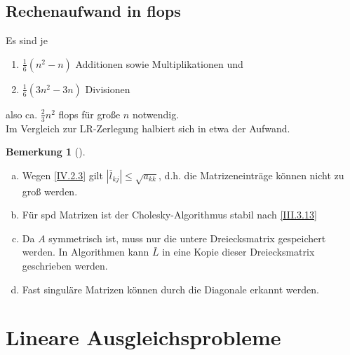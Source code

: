 \documentclass[ngerman,fontsize=11pt, paper=a4, parskip=half, titlepage=true, toc=bib]{scrbook}
\theoremstyle{definition}
\newtheorem{Bem}[Def]{Bemerkung}	%
\theoremstyle{plain}
\newcommand{\sectione}[1]{ \setcounter{equation}{0}\section{#1}}
\newcommand{\subsectione}[1]{\addtocounter{Def}{1}\subsection{#1}}
\newenvironment{Beme}[1][]{ %
  \begin{Bem}[#1]
  }
  {
  \end{Bem}
  \addtocounter{subsection}{1}
}
\begin{document}
\subsectione{Rechenaufwand in flops}
Es sind je 
\begin{enumerate}
\item[] $\frac{1}{6}(n^2-n) $ Additionen sowie Multiplikationen und 
\item[]  $\frac{1}{6}(3n^2-3n) $ Divisionen 
\end{enumerate}
also ca. $\frac{2}{3} n^2$ flops für große $n$ notwendig. \\
Im Vergleich zur LR-Zerlegung halbiert sich in etwa der Aufwand.

\begin{Beme}~
  \begin{enumerate}[a)]
  \item Wegen \eqref{IV.2.3} gilt $|\overline{l}_{kj}| \leq \sqrt{a_{kk}}$,
    d.h. die Matrizeneinträge können nicht zu groß werden.
  \item Für spd Matrizen ist der Cholesky-Algorithmus stabil nach \eqref{III.3.13}
  \item Da $A$ symmetrisch ist, muss nur die untere Dreiecksmatrix gespeichert werden.
    In Algorithmen kann $\bar{L}$ in eine Kopie dieser Dreiecksmatrix geschrieben werden.
  \item Fast singuläre Matrizen können durch die Diagonale erkannt werden.
  \end{enumerate}
\end{Beme}


\sectione{Lineare Ausgleichsprobleme} 
\end{document}
